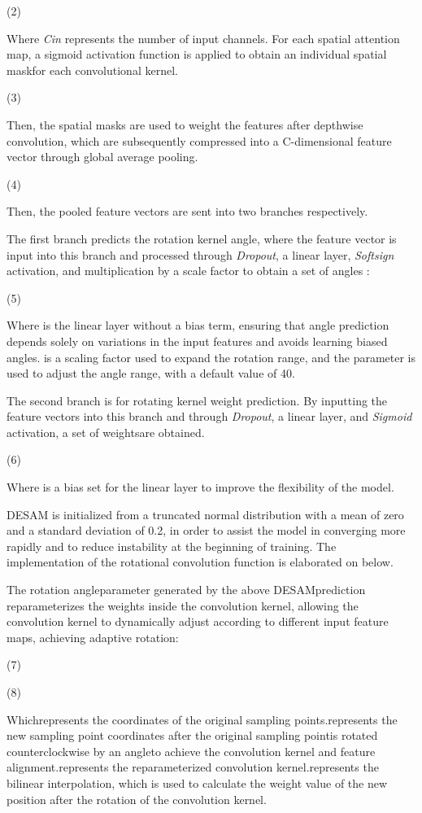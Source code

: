\documentclass[journal]{IEEEtran}
\begin{document}
	(2)

Where \textit{C}\textit{in} represents the number of input channels. For each spatial attention map, a sigmoid activation function is applied to obtain an individual spatial maskfor each convolutional kernel.

	(3)

Then, the spatial masks are used to weight the features after depthwise convolution, which are subsequently compressed into a C-dimensional feature vector through global average pooling.

	(4)

Then, the pooled feature vectors are sent into two branches respectively.

The first branch predicts the rotation kernel angle, where the feature vector is input into this branch and processed through \textit{Dropout}, a linear layer, \textit{Softsign} activation, and multiplication by a scale factor to obtain a set of angles :

	(5)

Where is the linear layer without a bias term, ensuring that angle prediction depends solely on variations in the input features and avoids learning biased angles.  is a scaling factor used to expand the rotation range, and the parameter  is used to adjust the angle range, with a default value of 40.

	The second branch is for rotating kernel weight prediction. By inputting the feature vectors into this branch and through \textit{Dropout}, a linear layer, and \textit{Sigmoid} activation, a set of weightsare obtained.

	(6)

	Where  is a bias set for the linear layer to improve the flexibility of the model.

DESAM is initialized from a truncated normal distribution with a mean of zero and a standard deviation of 0.2, in order to assist the model in converging more rapidly and to reduce instability at the beginning of training. The implementation of the rotational convolution function is elaborated on below.

The rotation angleparameter generated by the above DESAMprediction reparameterizes the weights inside the convolution kernel, allowing the convolution kernel to dynamically adjust according to different input feature maps, achieving adaptive rotation:

	(7)

	(8)

	Whichrepresents the coordinates of the original sampling points.represents the new sampling point coordinates after the original sampling pointis rotated counterclockwise by an angleto achieve the convolution kernel and feature alignment.represents the reparameterized convolution kernel.represents the bilinear interpolation, which is used to calculate the weight value of the new position after the rotation of the  convolution kernel.
\end{document}
